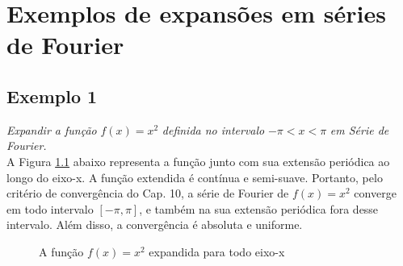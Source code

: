 \chapter{Exemplos de expansões em séries de Fourier}
\section*{Exemplo 1}
\textit{Expandir a função }$f(x) = x^2$\textit{ definida no intervalo }$-\pi < x < \pi$\textit{ em 
Série de Fourier.}\\

A Figura \ref{fig:functIntRepEx} abaixo representa a função
junto com sua extensão periódica ao longo do eixo-x. A função extendida
é contínua e semi-suave. Portanto, pelo critério de convergência do Cap. 10,
a série de Fourier de $f(x) = x^2$ converge em todo intervalo $[-\pi,\pi]$, e
também na sua extensão periódica fora desse intervalo. Além disso, a convergência
é absoluta e uniforme. 

\begin{figure}[H]

    \caption{A função $f(x) = x^2$ expandida para todo eixo-x}
    \label{fig:functIntRepEx}
\end{figure}

